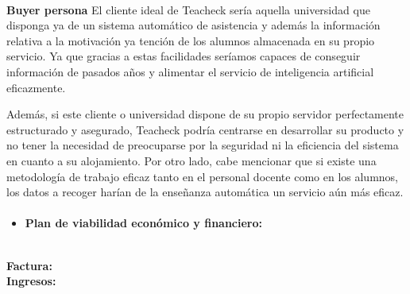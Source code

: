 \paragraph{}
\textbf{Buyer persona}
El cliente ideal de Teacheck sería aquella universidad que disponga ya de un sistema automático de asistencia y además la información relativa a la motivación ya tención de los alumnos almacenada en su propio servicio. Ya que gracias a estas facilidades seríamos capaces de conseguir información de pasados años y alimentar el servicio de inteligencia artificial eficazmente.

Además, si este cliente o universidad dispone de su propio servidor perfectamente estructurado y asegurado, Teacheck podría centrarse en desarrollar su producto y no tener la necesidad de preocuparse por la seguridad ni la eficiencia del sistema en cuanto a su alojamiento.
Por otro lado, cabe mencionar que si existe una metodología de trabajo eficaz tanto en el personal docente como en los alumnos, los datos a recoger harían de la enseñanza automática un servicio aún más eficaz.

\paragraph{}
\begin{itemize}
\item{\textbf{Plan de viabilidad económico y financiero:}}
\end{itemize}\\
\textbf{Factura:}\\
\textbf{Ingresos:}\\



